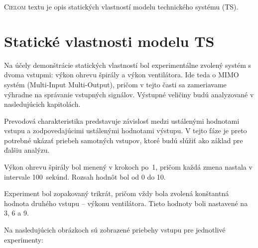 \documentclass[a4paper, 10pt, ]{article}
\begin{document}
\bigskip

\normalsize
\normalfont

\lstset{style=mystyle}


\noindent
\lettrine[lines=1, nindent=1pt, loversize=0.0]{C}{ieľom} 
textu je opis statických vlastností modelu technického systému (TS).


\section{Statické vlastnosti modelu TS}

\noindent
Na účely demonštrácie statických vlastností bol experimentálne 
zvolený systém s dvoma vstupmi: výkon ohrevu špirály a 
výkon ventilátora. Ide teda o MIMO systém 
(Multi-Input Multi-Output), pričom v tejto časti sa zameriavame výhradne 
na správanie vstupných signálov. Výstupné veličiny budú analyzované 
v nasledujúcich kapitolách. 

\medskip

\noindent
Prevodová charakteristika predstavuje závislosť medzi ustálenými 
hodnotami vstupu a zodpovedajúcimi ustálenými hodnotami výstupu. 
V tejto fáze je preto potrebné ukázať priebeh samotných vstupov, 
ktoré budú slúžiť ako základ pre ďalšiu analýzu. 

\medskip

\noindent
Výkon ohrevu špirály bol menený v krokoch po~1, pričom každá zmena 
nastala v intervale 100~sekúnd. Rozsah hodnôt bol od 0 do 10. 

\begin{center}
    \vbox{%
        \label{fig_spirala_time}
    }%
\end{center}

\noindent
Experiment bol zopakovaný trikrát, pričom vždy bola zvolená konštantná 
hodnota druhého vstupu – výkonu ventilátora. Tieto hodnoty boli 
nastavené na 3, 6 a 9. 

\medskip

\newpage

\noindent
Na nasledujúcich obrázkoch sú zobrazené priebehy vstupu pre jednotlivé 
experimenty:
\end{document}
